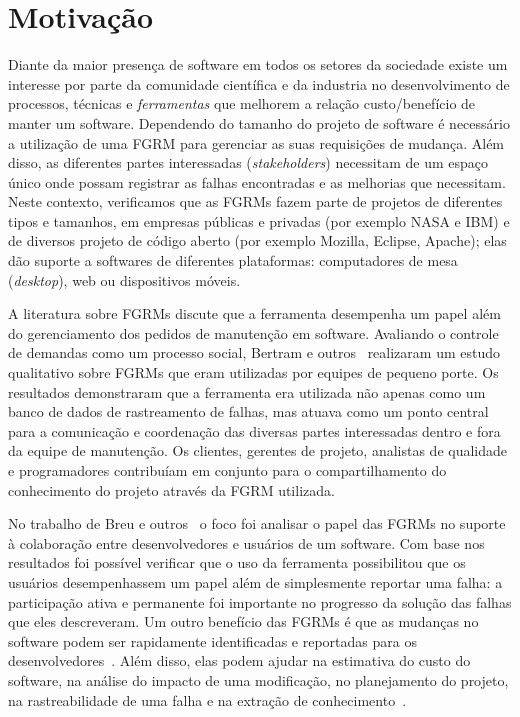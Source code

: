 \section{Motivação}
\label{sec:intro-motivacao}

Diante da maior presença de software em todos os setores da sociedade existe um
interesse por parte da comunidade científica e da industria no desenvolvimento
de processos, técnicas e \textit{ferramentas} que melhorem a relação
custo/benefício de manter um software. Dependendo do tamanho do projeto de
software é necessário a utilização de uma FGRM para gerenciar as suas
requisições de mudança. Além disso, as diferentes partes interessadas
(\textit{stakeholders}) necessitam de um espaço único onde possam registrar as
falhas encontradas e as melhorias que necessitam. Neste contexto, verificamos
que as FGRMs fazem parte de projetos de diferentes tipos e tamanhos, em
empresas públicas e privadas (por exemplo NASA e IBM) e de diversos projeto de
código aberto (por exemplo Mozilla, Eclipse, Apache); elas dão suporte a
softwares de diferentes plataformas: computadores de mesa (\textit{desktop}),
web ou dispositivos móveis.

A literatura sobre FGRMs discute que a ferramenta desempenha um papel além do
gerenciamento dos pedidos de manutenção em software. Avaliando o controle de
demandas como um processo social, Bertram e
outros~\cite{Bertram:2010:CCB:1718918.1718972} realizaram um estudo qualitativo
sobre FGRMs que eram utilizadas por equipes de pequeno porte. Os resultados
demonstraram que a ferramenta era utilizada não apenas como um banco de dados de
rastreamento de falhas, mas atuava como um ponto central para a comunicação e
coordenação das diversas partes interessadas dentro e fora da equipe de
manutenção. Os clientes, gerentes de projeto, analistas de qualidade e
programadores contribuíam em conjunto para o compartilhamento do conhecimento do
projeto através da FGRM utilizada.

No trabalho de Breu e outros~\cite{Breu:2010:INB:1718918.1718973} o foco foi
analisar o papel das FGRMs no suporte à colaboração entre desenvolvedores e
usuários de um software. Com base nos resultados foi possível verificar que o
uso da ferramenta possibilitou que os usuários desempenhassem um papel além de
simplesmente reportar uma falha: a participação ativa e permanente foi
importante no progresso da solução das falhas que eles descreveram. Um outro
benefício das FGRMs é que as mudanças no software podem ser rapidamente
identificadas e reportadas para os desenvolvedores~\cite{anvik2005coping}. Além
disso, elas podem ajudar na estimativa do custo do software, na análise do
impacto de uma modificação, no planejamento do projeto, na rastreabilidade de
uma falha e na extração de conhecimento~\cite{cavalcanti2013bug}.

